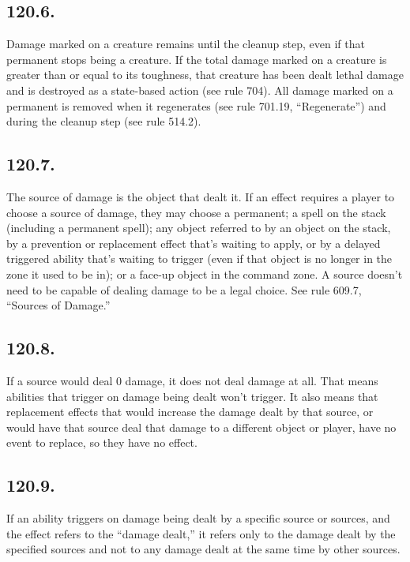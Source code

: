 \subsection*{120.6.}
Damage marked on a creature remains until the cleanup step, even if that permanent stops being a creature. If the total damage marked on a creature is greater than or equal to its toughness, that creature has been dealt lethal damage and is destroyed as a state-based action (see rule 704). All damage marked on a permanent is removed when it regenerates (see rule 701.19, “Regenerate”) and during the cleanup step (see rule 514.2).

\subsection*{120.7.}
The source of damage is the object that dealt it. If an effect requires a player to choose a source of damage, they may choose a permanent; a spell on the stack (including a permanent spell); any object referred to by an object on the stack, by a prevention or replacement effect that’s waiting to apply, or by a delayed triggered ability that’s waiting to trigger (even if that object is no longer in the zone it used to be in); or a face-up object in the command zone. A source doesn’t need to be capable of dealing damage to be a legal choice. See rule 609.7, “Sources of Damage.”

\subsection*{120.8.}
If a source would deal 0 damage, it does not deal damage at all. That means abilities that trigger on damage being dealt won’t trigger. It also means that replacement effects that would increase the damage dealt by that source, or would have that source deal that damage to a different object or player, have no event to replace, so they have no effect.

\subsection*{120.9.}
If an ability triggers on damage being dealt by a specific source or sources, and the effect refers to the “damage dealt,” it refers only to the damage dealt by the specified sources and not to any damage dealt at the same time by other sources.

